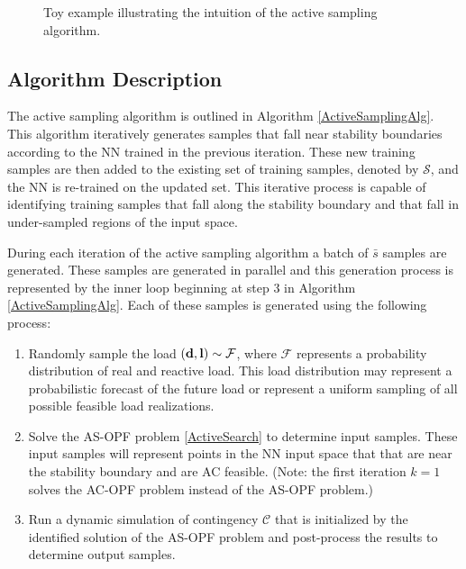 \documentclass[lettersize,journal]{IEEEtran}
\begin{document}
\begin{figure}[t]
\vspace{-5pt}
\caption{\label{fig:ToyExample} Toy example illustrating the intuition of the active sampling algorithm.}
\end{figure}


\subsection{Algorithm Description}
The active sampling algorithm is outlined in Algorithm \ref{ActiveSamplingAlg}.  This algorithm iteratively generates samples that fall near stability boundaries according to the NN trained in the previous iteration.  These new training samples are then added to the existing set of training samples, denoted by $\mathcal{S}$, and the NN is re-trained on the updated set. This iterative process is capable of identifying training samples that fall along the stability boundary and that fall in under-sampled regions of the input space.  

During each iteration of the active sampling algorithm a batch of $\bar{s}$ samples are generated.  These samples are generated in parallel and this generation process is represented by the inner loop beginning at step 3 in Algorithm \ref{ActiveSamplingAlg}.  Each of these samples is generated using the following process:
\begin{enumerate}
    \item Randomly sample the load $(\bold{d},\bold{l})\sim\mathcal{F}$, where $\mathcal{F}$ represents a probability distribution of real and reactive load. This load distribution may represent a probabilistic forecast of the future load or represent a uniform sampling of all possible feasible load realizations.
    \item Solve the AS-OPF problem \eqref{ActiveSearch} to determine input samples. These input samples will represent points in the NN input space that that are near the stability boundary and are AC feasible. (Note: the first iteration $k=1$ solves the AC-OPF problem instead of the AS-OPF problem.)
    \item Run a dynamic simulation of contingency $\mathcal{C}$ that is initialized by the identified solution of the AS-OPF problem and post-process the results to determine output samples.
\end{enumerate}
\end{document}

